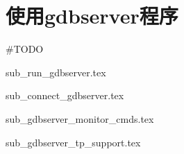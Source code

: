\section{使用gdbserver程序}

\#TODO

{sub_run_gdbserver.tex}

{sub_connect_gdbserver.tex}

{sub_gdbserver_monitor_cmds.tex}

{sub_gdbserver_tp_support.tex}
